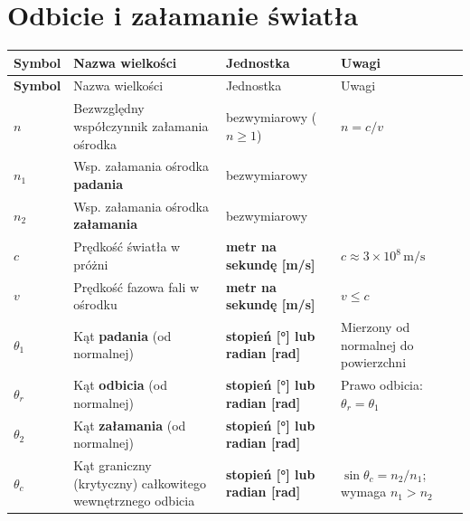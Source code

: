 \documentclass[12pt,a4paper]{article}
\begin{document}
\section{Odbicie i załamanie światła}

\begin{longtable}{>{\bfseries}p{1.6cm} p{6.5cm} p{3.2cm} p{3.5cm}}
\toprule
\rowcolor{headercolor}
\color{white}Symbol &
\color{white}Nazwa wielkości &
\color{white}Jednostka &
\color{white}Uwagi \\
\midrule
\endfirsthead
\toprule
\rowcolor{headercolor}
\color{white}Symbol &
\color{white}Nazwa wielkości &
\color{white}Jednostka &
\color{white}Uwagi \\
\midrule
\endhead
\bottomrule
\endfoot

\rowcolor{rowodbl}
$n$     & Bezwzględny współczynnik załamania ośrodka
        & bezwymiarowy ($n\geq 1$)
        & $n = c/v$ \\

\rowcolor{rowodbl}
$n_1$   & Wsp. załamania ośrodka \textbf{padania}
        & bezwymiarowy
        & \\

\rowcolor{rowodbl}
$n_2$   & Wsp. załamania ośrodka \textbf{załamania}
        & bezwymiarowy
        & \\

\rowcolor{rowodbl}
$c$     & Prędkość światła w próżni
        & \textbf{metr na sekundę [m/s]}
        & $c \approx 3\times10^8\,\mathrm{m/s}$ \\

\rowcolor{rowodbl}
$v$     & Prędkość fazowa fali w ośrodku
        & \textbf{metr na sekundę [m/s]}
        & $v \leq c$ \\

\rowcolor{rowodbl}
$\theta_1$ & Kąt \textbf{padania} (od normalnej)
        & \textbf{stopień [°] lub radian [rad]}
        & Mierzony od normalnej do powierzchni \\

\rowcolor{rowodbl}
$\theta_r$ & Kąt \textbf{odbicia} (od normalnej)
        & \textbf{stopień [°] lub radian [rad]}
        & Prawo odbicia: $\theta_r = \theta_1$ \\

\rowcolor{rowodbl}
$\theta_2$ & Kąt \textbf{załamania} (od normalnej)
        & \textbf{stopień [°] lub radian [rad]}
        & \\

\rowcolor{rowodbl}
$\theta_c$ & Kąt graniczny (krytyczny) całkowitego
             wewnętrznego odbicia
        & \textbf{stopień [°] lub radian [rad]}
        & $\sin\theta_c = n_2/n_1$;
          wymaga $n_1 > n_2$ \\

\end{longtable}
\end{document}
